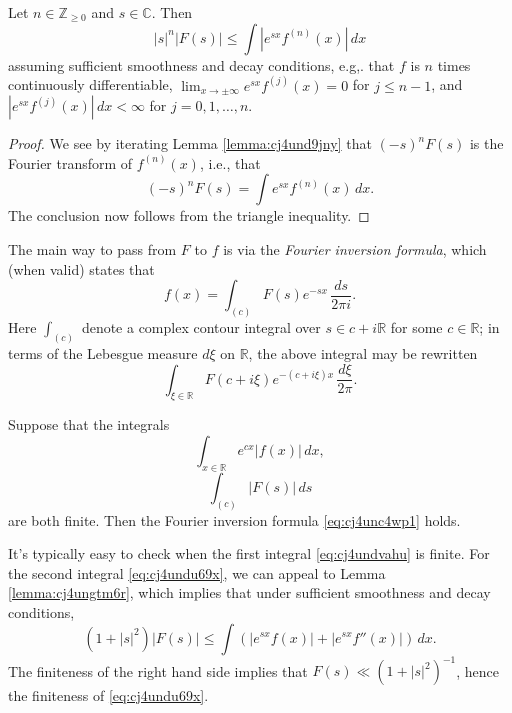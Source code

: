 \documentclass[reqno]{amsart}  \numberwithin{theorem}{section} \numberwithin{equation}{section}
\begin{document}
\begin{lemma}\label{lemma:cj4ungtm6r}
  Let $n \in \mathbb{Z}_{\geq 0}$ and $s \in \mathbb{C}$.  Then
  \begin{equation*}
    \lvert s \rvert^n \lvert F(s) \rvert \leq \int \left\lvert e^{s x} f^{(n)}(x) \right\rvert \, d x
  \end{equation*}
  assuming sufficient smoothness and decay conditions, e.g,. that $f$ is $n$ times continuously differentiable, $\lim_{x \rightarrow \pm \infty }e^{s x } f ^{(j)}(x) = 0$ for $j \leq n-1$, and $\left\lvert e^{s x } f^{(j)}(x) \right\rvert \,d x< \infty $ for $j =0, 1,\dotsc, n$.
\end{lemma}
\begin{proof}
  We see by iterating Lemma \ref{lemma:cj4und9jny} that $(-s)^n F(s)$ is the Fourier transform of $f^{(n)}(x)$, i.e., that
  \begin{equation*}
    (-s)^n F(s) = \int e^{s x } f^{(n)} (x) \, d x.
  \end{equation*}
  The conclusion now follows from the triangle inequality.
\end{proof}


The main way to pass from $F$ to $f$ is via the \emph{Fourier inversion formula}, which (when valid) states that
\begin{equation}\label{eq:cj4unc4wp1}
  f (x) = \int_{(c)} F(s) e^{- s x} \, \frac{d s }{2 \pi i}.
\end{equation}
Here $\int_{(c)}$ denote a complex contour integral over $s \in c + i \mathbb{R}$ for some $c \in \mathbb{R}$; in terms of the Lebesgue measure $d \xi$ on $\mathbb{R}$, the above integral may be rewritten
\begin{equation*}
  \int_{\xi \in \mathbb{R}} F(c + i \xi ) e^{- (c + i \xi) x} \, \frac{d \xi  }{2 \pi}.
\end{equation*}
\begin{theorem}
  Suppose that the integrals
  \begin{equation}\label{eq:cj4undvahu}
    \int_{x \in \mathbb{R} } e^{c x} \lvert f(x) \rvert \, d x,
  \end{equation}
  \begin{equation}\label{eq:cj4undu69x}
    \int_{(c)} \lvert F(s) \rvert \, d s
  \end{equation}
  are both finite.  Then the Fourier inversion formula \eqref{eq:cj4unc4wp1} holds.
\end{theorem}
It's typically easy to check when the first integral \eqref{eq:cj4undvahu} is finite.  For the second integral \eqref{eq:cj4undu69x}, we can appeal to Lemma \ref{lemma:cj4ungtm6r}, which implies that under sufficient smoothness and decay conditions,
\begin{equation*}
(1 + |s|^2) \lvert F(s) \rvert \leq \int \left( \lvert e^{s x } f(x) \rvert + \lvert e^{s x } f''(x) \rvert \right) \, d x.
\end{equation*}
The finiteness of the right hand side implies that $F(s) \ll (1 + |s|^2)^{-1}$, hence the finiteness of \eqref{eq:cj4undu69x}.
\end{document}
